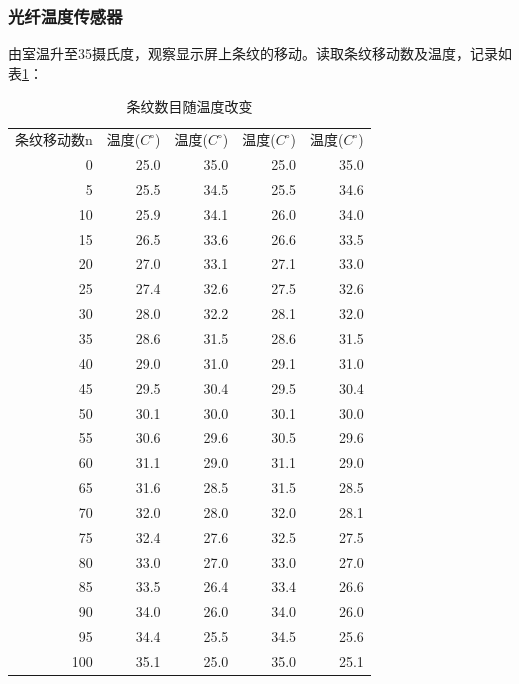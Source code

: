 \documentclass[10pt,a4paper,twoside,UTF8]{ctexart}
\begin{document}
  
\subsubsection{光纤温度传感器}

由室温升至35摄氏度，观察显示屏上条纹的移动。读取条纹移动数及温度，记录如表\ref{tab:T}：

\begin{table}[htbp]
	\centering
	\caption{条纹数目随温度改变}
	  \begin{tabular}{rrrrr}
	  \multicolumn{1}{l}{条纹移动数n} & \multicolumn{1}{l}{温度($C^{\circ}$)} & \multicolumn{1}{l}{温度($C^{\circ}$)} & \multicolumn{1}{l}{温度($C^{\circ}$)} & \multicolumn{1}{l}{温度($C^{\circ}$)} \\
	  0     & 25.0    & 35.0    & 25.0    & 35.0 \\
	  5     & 25.5  & 34.5  & 25.5  & 34.6 \\
	  10    & 25.9  & 34.1  & 26.0    & 34.0 \\
	  15    & 26.5  & 33.6  & 26.6  & 33.5 \\
	  20    & 27.0    & 33.1  & 27.1  & 33.0 \\
	  25    & 27.4  & 32.6  & 27.5  & 32.6 \\
	  30    & 28.0    & 32.2  & 28.1  & 32.0 \\
	  35    & 28.6  & 31.5  & 28.6  & 31.5 \\
	  40    & 29.0    & 31.0    & 29.1  & 31.0 \\
	  45    & 29.5  & 30.4  & 29.5  & 30.4 \\
	  50    & 30.1  & 30.0    & 30.1  & 30.0 \\
	  55    & 30.6  & 29.6  & 30.5  & 29.6 \\
	  60    & 31.1  & 29.0    & 31.1  & 29.0 \\
	  65    & 31.6  & 28.5  & 31.5  & 28.5 \\
	  70    & 32.0    & 28.0    & 32.0    & 28.1 \\
	  75    & 32.4  & 27.6  & 32.5  & 27.5 \\
	  80    & 33.0    & 27.0    & 33.0    & 27.0 \\
	  85    & 33.5  & 26.4  & 33.4  & 26.6 \\
	  90    & 34.0    & 26.0    & 34.0     & 26.0 \\
	  95    & 34.4  & 25.5  & 34.5  & 25.6 \\
	  100   & 35.1  & 25.0    & 35.0    & 25.1 \\
	  \end{tabular}%
	\label{tab:T}%
  \end{table}%
\end{document}
